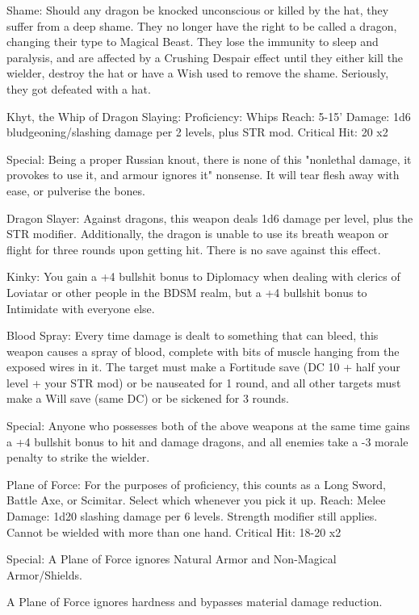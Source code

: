 Shame: Should any dragon be knocked unconscious or killed by the hat, they suffer from a deep shame. They no longer have the right to be called a dragon, changing their type to Magical Beast. They lose the immunity to sleep and paralysis, and are affected by a Crushing Despair effect until they either kill the wielder, destroy the hat or have a Wish used to remove the shame. Seriously, they got defeated with a hat.


Khyt, the Whip of Dragon Slaying:
Proficiency: Whips
Reach: 5-15'
Damage: 1d6 bludgeoning/slashing damage per 2 levels, plus STR mod.
Critical Hit: 20 x2

Special:
Being a proper Russian knout, there is none of this "nonlethal damage, it provokes to use it, and armour ignores it" nonsense. It will tear flesh away with ease, or pulverise the bones.

Dragon Slayer: Against dragons, this weapon deals 1d6 damage per level, plus the STR modifier. Additionally, the dragon is unable to use its breath weapon or flight for three rounds upon getting hit. There is no save against this effect.

Kinky: You gain a +4 bullshit bonus to Diplomacy when dealing with clerics of Loviatar or other people in the BDSM realm, but a +4 bullshit bonus to Intimidate with everyone else.

Blood Spray: Every time damage is dealt to something that can bleed, this weapon causes a spray of blood, complete with bits of muscle hanging from the exposed wires in it. The target must make a Fortitude save (DC 10 + half your level + your STR mod) or be nauseated for 1 round, and all other targets must make a Will save (same DC) or be sickened for 3 rounds.

Special: Anyone who possesses both of the above weapons at the same time gains a +4 bullshit bonus to hit and damage dragons, and all enemies take a -3 morale penalty to strike the wielder.


Plane of Force:
For the purposes of proficiency, this counts as a Long Sword, Battle Axe, or Scimitar. Select which whenever you pick it up.
Reach: Melee
Damage: 1d20 slashing damage per 6 levels. Strength modifier still applies. Cannot be wielded with more than one hand.
Critical Hit: 18-20 x2

Special:
A Plane of Force ignores Natural Armor and Non-Magical Armor/Shields.

A Plane of Force ignores hardness and bypasses material damage reduction.

